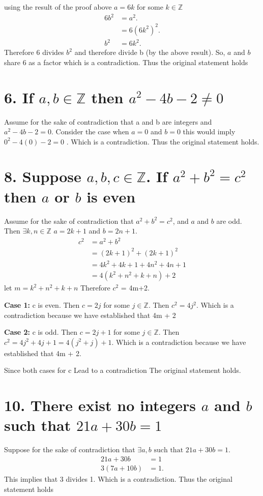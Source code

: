 \documentclass{article}
\newcommand{\ints}{\mathbb{Z}}
\newcommand{\st}{\text{ such that }}
\begin{document}
	using the result of the proof above $a = 6k$ for some $k \in \ints$
	\begin{align*}
		6b^2 &= a^2. \\
			 &= 6(6k^2)^2.\\
		b^2 &= 6k^2. 
	\end{align*}
	Therefore $6$ divides $b^2$ and therefore divide b (by the above result). So, $a$ and $b$  share 6 as a factor which is a contradiction. Thus the original statement holds
	
	\section*{6. If $a,b \in \ints$ then $a^2-4b - 2 \neq 0$}
	Assume for the sake of contradiction that a and b are integers and $a^2-4b - 2 = 0$. Consider the case when $a=0$ and $b=0$ this would imply $0^2 -4(0)-2 =0 $ . Which is a contradiction. Thus the original statement holds.
	
	\section*{8. Suppose $a,b,c \in \ints$. If $a^2+b^2=c^2$ then $a$ or $b$ is even}
	Assume for the sake of contradiction that $a^2+b^2=c^2$, and $a$ and $b$ are odd. Then $\exists k,n\in \ints$ \st $a=2k+1$ and $b = 2n+1$. 	
	\begin{align*}
		c^2 &= a^2 + b^2\\
		 	&= (2k+1)^2 + (2k+1)^2\\
		 	&= 4k^2 + 4k + 1 + 4n^2 + 4n + 1 \\
		 	&= 4(k^2+n^2 + k + n) + 2
	\end{align*}
	let $m= k^2+n^2 + k + n$ Therefore $c^2$ = 4m+2.
	
	\textbf{Case 1:} c is even.
	Then $c= 2j$ for some $j \in \ints$. Then $c^2 = 4j^2$. Which is a contradiction because we have established that 4m + 2
	
	\textbf{Case 2:} c is odd.
	Then $c= 2j+1$ for some $j \in \ints$. Then $c^2 = 4j^2+4j+ 1 =4(j^2+j)+1$. Which is a contradiction because we have established that 4m + 2.
	
	Since both cases for c Lead to a contradiction The original statement holds.
	
	\section*{10. There exist no integers $a$ and $b$ such that  $21a +30b = 1$}
	Suppose for the sake of contradiction that $\exists a,b \st 21a+30b=1$. 
	\begin{align*}
		21a+30b   &=1\\
		3(7a+10b) &=1.
	\end{align*}
		This implies that 3 divides 1. Which is a contradiction. Thus the original statement holds 
	
\end{document}
